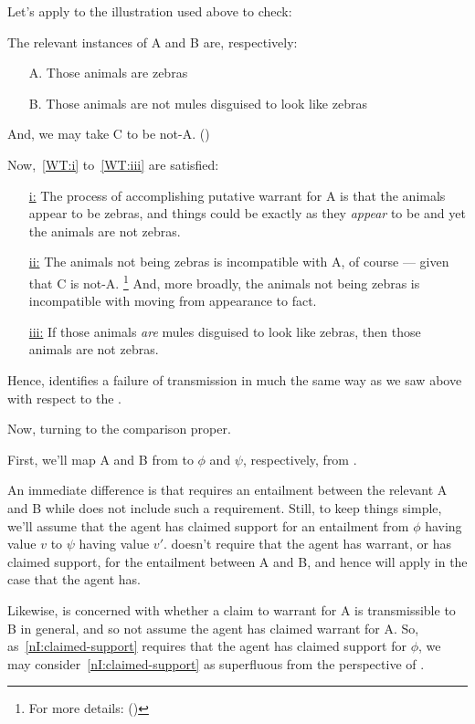 \begin{note}
  Let's apply \wrt{} to the illustration used above to check:

  The relevant instances of A and B are, respectively:
  \begin{itemize}
  \item[A.] Those animals are zebras
  \item[B.] Those animals are not mules disguised to look like zebras
  \end{itemize}
  And, we may take C to be not-A. (\Citeyear[90]{Wright:2011wn})

  Now,~\ref{WT:i} to~\ref{WT:iii} are satisfied:

  \begin{itemize}
  \item[{\hyperref[WT:i]{i:}}] The process of accomplishing putative warrant for A is that the animals appear to be zebras, and things could be exactly as they \emph{appear} to be and yet the animals are not zebras.
  \item[{\hyperref[WT:ii]{ii:}}] The animals not being zebras is incompatible with A, of course --- given that C is not-A.\nolinebreak
    \footnote{
      For more details: (\Citeyear[90--96]{Wright:2011wn})
    }
    And, more broadly, the animals not being zebras is incompatible with moving from appearance to fact.
  \item[{\hyperref[WT:iii]{iii:}}] If those animals \emph{are} mules disguised to look like zebras, then those animals are not zebras.
  \end{itemize}
  Hence, \wrt{} identifies a failure of transmission in much the same way as we saw above with respect to the \widt{}.
\end{note}

\begin{note}[Entailment]
  Now, turning to the comparison proper.

  First, we'll map A and B from \wrt{} to \(\phi\) and \(\psi\), respectively, from \nI{}.

  An immediate difference is that \wrt{} requires an entailment between the relevant A and B while \nI{} does not include such a requirement.
  Still, to keep things simple, we'll assume that the agent has claimed support for an entailment from \(\phi\) having value \(v\) to \(\psi\) having value \(v'\).
  \wrt{} doesn't require that the agent has warrant, or has claimed support, for the entailment between A and B, and hence will apply in the case that the agent has.

  Likewise, \wrt{} is concerned with whether a claim to warrant for A is transmissible to B in general, and so not assume the agent has claimed warrant for A.
  So, as~\ref{nI:claimed-support} requires that the agent has claimed support for \(\phi\), we may consider~\ref{nI:claimed-support} as superfluous from the perspective of \wrt{}.
\end{note}

